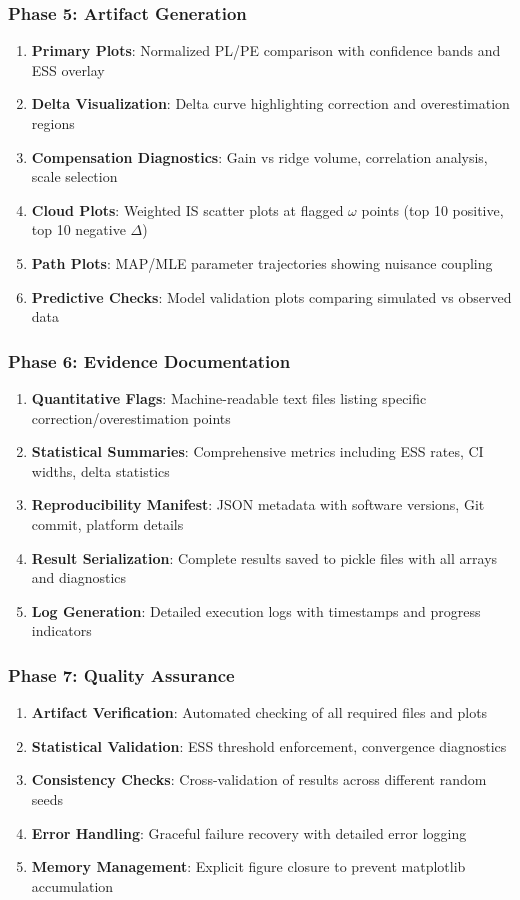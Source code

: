 \documentclass[conference]{IEEEtran}
\begin{document}
\subsubsection{Phase 5: Artifact Generation}
\begin{enumerate}
\item \textbf{Primary Plots}: Normalized PL/PE comparison with confidence bands and ESS overlay
\item \textbf{Delta Visualization}: Delta curve highlighting correction and overestimation regions
\item \textbf{Compensation Diagnostics}: Gain vs ridge volume, correlation analysis, scale selection
\item \textbf{Cloud Plots}: Weighted IS scatter plots at flagged $\omega$ points (top 10 positive, top 10 negative $\Delta$)
\item \textbf{Path Plots}: MAP/MLE parameter trajectories showing nuisance coupling
\item \textbf{Predictive Checks}: Model validation plots comparing simulated vs observed data
\end{enumerate}

\subsubsection{Phase 6: Evidence Documentation}
\begin{enumerate}
\item \textbf{Quantitative Flags}: Machine-readable text files listing specific correction/overestimation points
\item \textbf{Statistical Summaries}: Comprehensive metrics including ESS rates, CI widths, delta statistics
\item \textbf{Reproducibility Manifest}: JSON metadata with software versions, Git commit, platform details
\item \textbf{Result Serialization}: Complete results saved to pickle files with all arrays and diagnostics
\item \textbf{Log Generation}: Detailed execution logs with timestamps and progress indicators
\end{enumerate}

\subsubsection{Phase 7: Quality Assurance}
\begin{enumerate}
\item \textbf{Artifact Verification}: Automated checking of all required files and plots
\item \textbf{Statistical Validation}: ESS threshold enforcement, convergence diagnostics
\item \textbf{Consistency Checks}: Cross-validation of results across different random seeds
\item \textbf{Error Handling}: Graceful failure recovery with detailed error logging
\item \textbf{Memory Management}: Explicit figure closure to prevent matplotlib accumulation
\end{enumerate}
\end{document}
